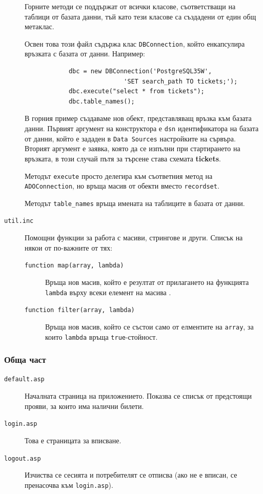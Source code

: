 \documentclass[a4paper,10pt, leqno]{article}
\newcommand{\tab}[1] {\textbf{#1}}
\newcommand{\File}[1] {\texttt{#1}}
\begin{document}
\begin{description}
		    Горните методи се поддържат от всички класове, съответстващи на таблици от базата данни, тъй като тези класове
		    са създадени от един общ метаклас.

		    Освен това този файл съдържа клас \texttt{DBConnection}, който енкапсулира връзката с базата от данни.
		    Например:

		    \begin{verbatim}
		    dbc = new DBConnection('PostgreSQL35W',
		    	 		   'SET search_path TO tickets;');
		    dbc.execute("select * from tickets");
		    dbc.table_names();
		    \end{verbatim}

		    В горния пример създаваме нов обект, представляващ връзка към базата данни.
		    Първият аргумент на конструктора е \texttt{dsn} идентификатора на базата от данни, който
		    е зададен в \texttt{Data Sources} настройките на сървъра. Вторият аргумент е заявка, която да се изпълни при стартирането
		    на връзката, в този случай пътя за търсене става схемата \tab{tickets}.

		    Методът \texttt{execute} просто делегира към съответния метод на \texttt{ADOConnection}, но връща масив от обекти вместо
		    \texttt{recordset}.

		    Методът \texttt{table\_names} връща имената на таблиците в базата от данни.

		  \item[\File{util.inc}]
		    Помощни функции за работа с масиви, стрингове и други. Списък на някои от по-важните от тях:
		    \begin{description}
		      \item[\texttt{function map(array, lambda)}]
			Връща нов масив, който е резултат от прилагането на функцията \texttt{lambda} върху всеки елемент на масива .
		      \item[\texttt{function filter(array, lambda)}]
			Връща нов масив, който се състои само от елментите на \texttt{array}, за които \texttt{lambda} връща \texttt{true}-стойност.
		    	
		    \end{description}

		\end{description}


		\subsubsection{Обща част}
		\begin{description}
		  \item[\File{default.asp}]
		    Началната страница на приложението. Показва се списък от предстоящи прояви, за които има налични билети.
		  \item[\File{login.asp}]
		    Това е страницата за вписване.
		  \item[\File{logout.asp}]
		    Изчиства се сесията и потребителят се отписва (ако не е вписан, се пренасочва към \File{login.asp}).
		\end{description}
\end{document}
